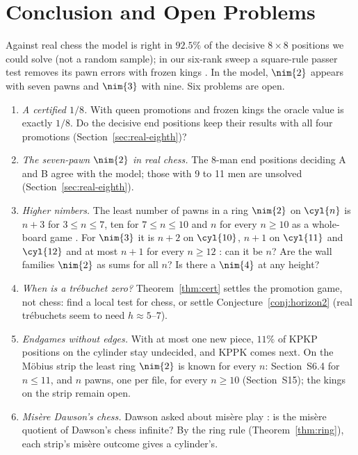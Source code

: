 \section{Conclusion and Open Problems}\label{sec:conclusion}

Against real chess the model is right in $92.5\%$ of the decisive $8\times8$ positions we could solve (not a random sample); in our six-rank sweep a
square-rule passer test removes its pawn errors with frozen kings . In the model,
$\nim{2}$ appears with seven pawns and $\nim{3}$ with nine. Six problems are open.

\begin{enumerate}
\item \emph{A certified $1/8$.} With queen promotions and frozen kings the oracle value is exactly $1/8$. Do
  the decisive end positions keep their results with all four promotions (Section~\ref{sec:real-eighth})?
\item \emph{The seven-pawn $\nim{2}$ in real chess.} The 8-man end positions deciding A and B agree with the
  model; those with 9 to 11 men are unsolved
  (Section~\ref{sec:real-eighth}).
\item \emph{Higher nimbers.} The least number of pawns in a ring $\nim{2}$ on $\cyl{n}$ is $n+3$ for $3\le n\le7$,
  ten for $7\le n\le10$  and $n$ for every $n\ge10$ as a whole-board game . For $\nim{3}$ it is $n+2$ on $\cyl{10}$, $n+1$ on $\cyl{11}$ and $\cyl{12}$  and at
  most $n+1$ for every $n\ge12$ : can it be $n$? Are the wall
  families $\nim{2}$ as sums for all $n$? Is there a $\nim{4}$ at any height?
\item \emph{When is a tr\'ebuchet zero?} Theorem~\ref{thm:cert} settles the promotion game, not chess: find a
  local test for chess, or settle Conjecture~\ref{conj:horizon2} (real tr\'ebuchets seem to need $h\approx5$--$7$).
\item \emph{Endgames without edges.} With at most one new piece, $11\%$ of KPKP positions on the cylinder
  stay undecided, and KPPK comes next. On the M\"obius strip the least ring $\nim{2}$ is known for every $n$: Section~S6.4 for $n\le11$,
  and $n$ pawns, one per file, for every $n\ge10$ (Section~S15); the kings on the strip remain open.
\item \emph{Mis\`ere Dawson's chess.} Dawson asked about mis\`ere play \cite{Dawson1935}: is the mis\`ere
  quotient \cite{PlambeckSiegel2008} of Dawson's chess infinite? By the ring rule (Theorem~\ref{thm:ring}), each
  strip's mis\`ere outcome gives a cylinder's.
\end{enumerate}
